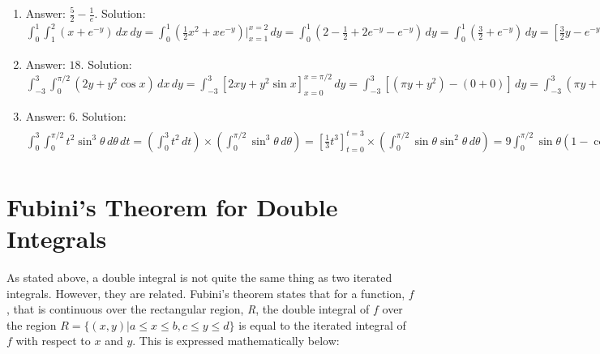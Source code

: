 \begin{Answer}[ref = iterate_2]
\begin{enumerate}
\item Answer: $\frac{5}{2} - \frac{1}{e}$. Solution: $\int_0^1 \int_1^2 \left( 
x + e^{-y} \right)\,dx\,dy = \int_0^1 \left( \frac{1}{2}x^2 + xe^{-y} \right)
|_{x=1}^{x=2}\,dy = \int_0^1 \left( 2 - \frac{1}{2} + 2e^{-y} - e^{-y} \right)
\,dy = \int_0^1 \left( \frac{3}{2} + e^{-y} \right)\,dy = \left[ \frac{3}{2}y 
- e^{-y} \right]_{y = 0}^{y = 1} = \left( \frac{3}{2}(1) - e^{-1} \right) - 
\left( \frac{3}{2}(0) - e^0 \right) = \frac{5}{2} - \frac{1}{e}$
\item Answer: $18$. Solution: $\int_{-3}^3 \int_{0}^{\pi/2} \left( 2y + y^2 
\cos{x} \right)\,dx\,dy = \int_{-3}^3 \left[ 2xy + y^2 \sin{x} \right]_{x = 0}^
{x = \pi/2}\,dy = \int_{-3}^3 \left[ \left( \pi y + y^2 \right) - \left( 0 + 0 
\right) \right]\,dy = \int_{-3}^3 \left( \pi y + y^2 \right)\,dy = \left[ 
\frac{\pi}{2}y^2 + \frac{1}{3}y^3 \right]_{y = -3}^{y = 3} = \left( \frac{\pi}{
2}(9) + \frac{1}{3}(27) \right) - \left( \frac{\pi}{2}(9) + \frac{1}{3}(-27) 
\right) = 9 - (-9) = 18$
\item Answer: $6$. Solution: $\int_0^3 \int_0^{\pi/2} t^2 \sin^3{\theta}\,
d\theta\,dt = \left( \int_0^3 t^2\,dt \right) \times \left( \int_0^{\pi/2} 
\sin^3{\theta}\,d\theta \right) = \left[ \frac{1}{3}t^3 \right]_{t = 0}^{t = 3}
\times \left( \int_0^{\pi/2} \sin{\theta} \sin^2{\theta}\,d\theta \right) = 9
\int_0^{\pi/2} \sin{\theta} \left( 1 - \cos^2{\theta} \right)\,d\theta = 9 
\left[ \int_0^{\pi/2} \sin{\theta}\,d\theta - \int_0^{\pi/2} \sin{\theta}
\cos^2{\theta}\,d\theta \right] = 9 \left[ \left( -\cos{\theta} \right) |_{
\theta = 0}^{\theta = \pi/2} + \left( \frac{1}{3}\cos^3{\theta} \right)|_{
\theta = 0}^{\theta = \pi/2} \right] = 9 \left[ -(-\cos{0}) + (-\frac{1}{3}
\cos^3{0}) \right] = 9 \left( 1 - \frac{1}{3} \right) = 9 \left( \frac{2}{3} 
\right) = 6$
\end{enumerate}
\end{Answer}

\section{Fubini's Theorem for Double Integrals}

As stated above, a double integral is not quite the same thing as two iterated 
integrals. However, they are related. Fubini's theorem states that for a 
function, $f$, that is continuous over the rectangular region, \textit{R}, the 
double integral of $f$ over the region $\textit{R} = \{ (x, y) | a \leq x \leq 
b, c \leq y \leq d\}$ is equal to the iterated integral of $f$ with respect to 
$x$ and $y$. This is expressed mathematically below:

